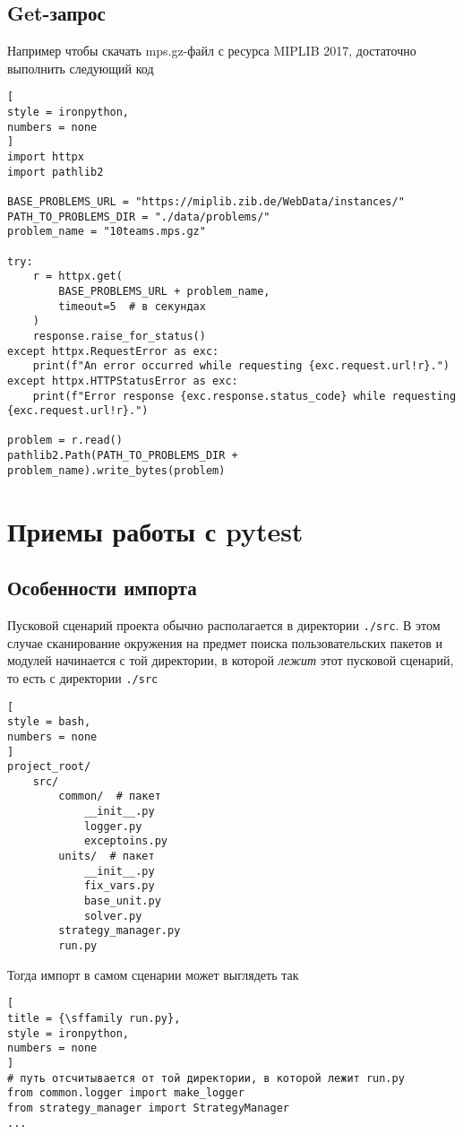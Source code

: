 \documentclass[%
	11pt,
	a4paper,
	utf8,
		]{article}
\begin{document}
\subsection{Get-запрос}

Например чтобы скачать mps.gz-файл с ресурса MIPLIB 2017, достаточно выполнить следующий код
\begin{lstlisting}[
style = ironpython,
numbers = none
]
import httpx
import pathlib2

BASE_PROBLEMS_URL = "https://miplib.zib.de/WebData/instances/"
PATH_TO_PROBLEMS_DIR = "./data/problems/"
problem_name = "10teams.mps.gz"

try:
	r = httpx.get(
	    BASE_PROBLEMS_URL + problem_name,
	    timeout=5  # в секундах
	)
	response.raise_for_status()
except httpx.RequestError as exc:
    print(f"An error occurred while requesting {exc.request.url!r}.")
except httpx.HTTPStatusError as exc:
    print(f"Error response {exc.response.status_code} while requesting {exc.request.url!r}.")

problem = r.read()
pathlib2.Path(PATH_TO_PROBLEMS_DIR + problem_name).write_bytes(problem)
\end{lstlisting}

\section{Приемы работы с pytest}

\subsection{Особенности импорта}

Пусковой сценарий проекта обычно располагается в директории \verb|./src|. В этом случае сканирование окружения на предмет поиска пользовательских пакетов и модулей начинается с той директории, в которой \emph{лежит} этот пусковой сценарий, то есть с директории \verb|./src|
\begin{lstlisting}[
style = bash,
numbers = none
]
project_root/
    src/
        common/  # пакет
            __init__.py
            logger.py
            exceptoins.py
        units/  # пакет
            __init__.py
            fix_vars.py
            base_unit.py
            solver.py
        strategy_manager.py
        run.py
\end{lstlisting}

Тогда импорт в самом сценарии может выглядеть так
\begin{lstlisting}[
title = {\sffamily run.py},
style = ironpython,
numbers = none
]
# путь отсчитывается от той директории, в которой лежит run.py
from common.logger import make_logger
from strategy_manager import StrategyManager
...
\end{lstlisting}
\end{document}
